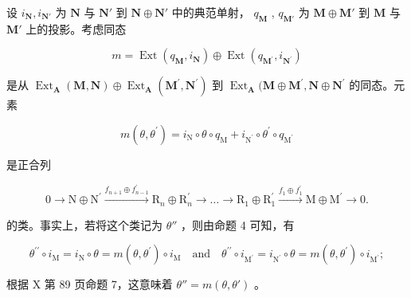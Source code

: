 设 \(i_{\mathbf{N}}, i_{\mathbf{N}'}\) 为 \(\mathbf{N}\) 与 \(\mathbf{N}'\) 到 \(\mathbf{N} \oplus \mathbf{N}'\) 中的典范单射， \(q_{\mathbf{M}}\) , \(q_{\mathbf{M}'}\) 为 \(\mathbf{M} \oplus \mathbf{M}'\) 到 \(\mathbf{M}\) 与 \(\mathbf{M}'\) 上的投影。考虑同态

\[
m = \operatorname{Ext} \left(q _ {\mathbf {M}}, i _ {\mathbf {N}}\right) \oplus \operatorname{Ext} \left(q _ {\mathbf {M} ^ {\prime}}, i _ {\mathbf {N} ^ {\prime}}\right)
\]

是从 \(\operatorname{Ext}_{\mathbf{A}}(\mathbf{M},\mathbf{N})\oplus \operatorname{Ext}_{\mathbf{A}}(\mathbf{M}^{\prime},\mathbf{N}^{\prime})\) 到 \(\operatorname{Ext}_{\mathbf{A}}(\mathbf{M}\oplus \mathbf{M}^{\prime},\mathbf{N}\oplus \mathbf{N}^{\prime}\) 的同态。元素

\[
m (\theta , \theta^ {\prime}) = i _ {\mathrm{N}} \circ \theta \circ q _ {\mathrm{M}} + i _ {\mathrm {N^ {\prime}}} \circ \theta^ {\prime} \circ q _ {\mathrm {M^ {\prime}}}
\]

是正合列

\[
0 \rightarrow \mathrm{N} \oplus \mathrm{N} ^ {\prime} \xrightarrow {f _ {n + 1} \oplus f _ {n - 1} ^ {\prime}} \mathrm{R} _ {n} \oplus \mathrm{R} _ {n} ^ {\prime} \rightarrow \dots \rightarrow \mathrm{R} _ {1} \oplus \mathrm{R} _ {1} ^ {\prime} \xrightarrow {f _ {1} \oplus f _ {1} ^ {\prime}} \mathrm{M} \oplus \mathrm{M} ^ {\prime} \rightarrow 0.
\]

的类。事实上，若将这个类记为 \(\theta''\) ，则由命题 4 可知，有

\[
\theta^ {\prime \prime} \circ i _ {\mathrm{M}} = i _ {\mathrm{N}} \circ \theta = m (\theta , \theta^ {\prime}) \circ i _ {\mathrm{M}} \quad \text {and} \quad \theta^ {\prime \prime} \circ i _ {\mathrm{M} ^ {\prime}} = i _ {\mathrm{N} ^ {\prime}} \circ \theta = m (\theta , \theta^ {\prime}) \circ i _ {\mathrm{M} ^ {\prime}};
\]

根据 X 第 89 页命题 7，这意味着 \(\theta'' = m(\theta, \theta')\) 。

